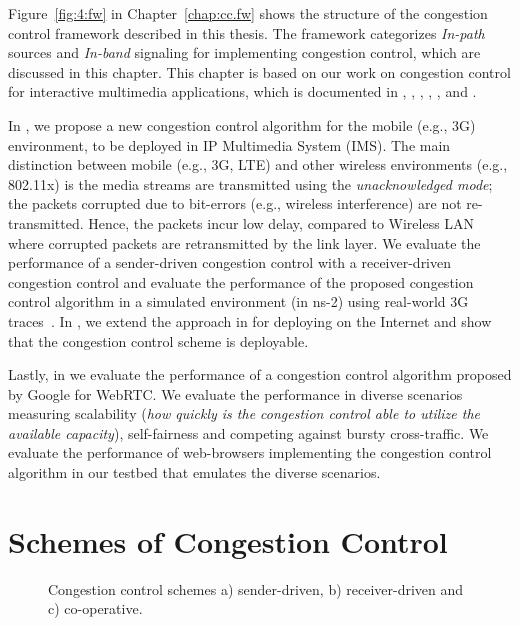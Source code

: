 Figure~\ref{fig:4:fw} in Chapter~\ref{chap:cc.fw} shows the structure of the
congestion control framework described in this thesis. The framework
categorizes \emph{In-path} sources and \emph{In-band} signaling for
implementing congestion control, which are discussed in this chapter. This
chapter is based on our work on congestion control for interactive multimedia
applications, which is documented in , ,
, \cite{draft.xr.discard.rle},
\cite{draft.xr.bytes.discarded}, \cite{singh:2010.thesis} and
\cite{Singh:control.loops.api}.

In , we propose a new congestion control algorithm for the
mobile (e.g., 3G) environment, to be deployed in IP Multimedia System (IMS).
The main distinction between mobile (e.g., 3G, LTE) and other wireless
environments (e.g., 802.11x) is the media streams are transmitted using the
\emph{unacknowledged mode}; the packets corrupted due to bit-errors (e.g.,
wireless interference) are not re-transmitted. Hence, the packets incur low
delay, compared to Wireless LAN where corrupted packets are retransmitted by
the link layer. We evaluate the performance of a sender-driven congestion
control with a receiver-driven congestion control and evaluate the performance
of the proposed congestion control algorithm in a simulated environment (in
ns-2) using real-world 3G traces~\cite{s4.eval.bitrate, 3gppSim}. In
, we extend the approach in  for deploying on
the Internet and show that the congestion control scheme is deployable.

Lastly, in  we evaluate the performance of a congestion
control algorithm proposed by Google for WebRTC. We evaluate the performance
in diverse scenarios measuring scalability (\emph{how quickly is the
congestion control able to utilize the available capacity}), self-fairness and
competing against bursty cross-traffic. We evaluate the performance of
web-browsers implementing the congestion control algorithm in our testbed that
emulates the diverse scenarios.

\section{Schemes of Congestion Control}

\begin{figure}
  \centerline{
  }
  \centerline{
  }
  \centerline{
  }
  \caption{Congestion control schemes a) sender-driven, b) receiver-driven
and c) co-operative.}
  \label{fig:cc:scheme}
\end{figure}

